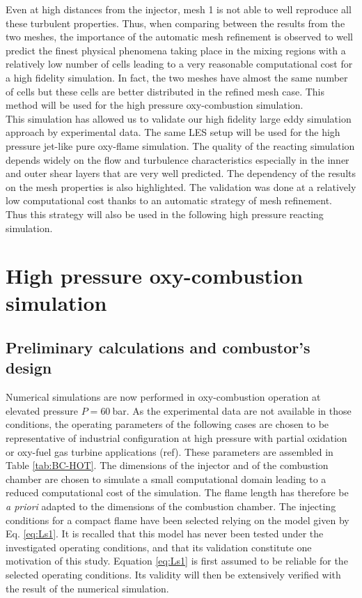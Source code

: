 \documentclass[twocolumn,10pt]{asme2e}
\begin{document}
Even at high distances from the injector, mesh 1 is not able to well reproduce all these turbulent properties. Thus, when comparing between the results from the two meshes, the importance of the automatic mesh refinement is observed to well predict the finest physical phenomena taking place in the mixing regions with a relatively low number of cells leading to a very reasonable computational cost for a high fidelity simulation. In fact, the two meshes have almost the same number of cells but these cells are better distributed in the refined mesh case. This method will be used for the high pressure oxy-combustion simulation. \\
This simulation has allowed us to validate our high fidelity large eddy simulation approach by experimental data. The same LES setup will be used for the high pressure jet-like pure oxy-flame simulation. The quality of the reacting simulation depends  widely on the flow and turbulence characteristics especially in the inner and outer shear layers that are very well predicted. The dependency of the results on the mesh properties is also highlighted. The validation was done at a relatively low computational cost thanks to an automatic strategy of mesh refinement. Thus this strategy will also be used in the following high pressure reacting simulation.      

\section*{High pressure oxy-combustion simulation}

\subsection*{Preliminary calculations and combustor's design}

Numerical simulations are now performed in oxy-combustion operation at elevated pressure $P=60~$bar. As the experimental data are not available in those conditions, the operating parameters of the following cases are chosen to be representative of industrial configuration at high pressure with partial oxidation \cite{richter2015large} or oxy-fuel gas turbine applications (ref). These parameters are assembled in Table \ref{tab:BC-HOT}. The dimensions of the injector and of the combustion chamber are chosen to simulate a small computational domain leading to a reduced computational cost of the simulation. The flame length has therefore be \textit{a priori} adapted to the dimensions of the combustion chamber. The injecting conditions for a compact flame have been selected relying on the model given by Eq. \ref{eq:Ls1}. It is recalled that this model has never been tested under the investigated operating conditions, and that its validation constitute one motivation of this study. Equation \ref{eq:Ls1} is first assumed to be reliable for the selected operating conditions. Its validity will then be extensively verified with the result of the numerical simulation.
\end{document}
